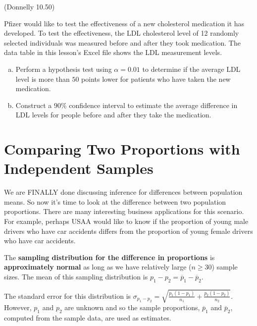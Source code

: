 \documentclass[12pt, letterpaper]{article}
\newcommand{\ds}{\displaystyle}
\newcounter{exercise}
\theoremstyle{definition}
\begin{document}
\begin{exercise}  (Donnelly 10.50)

Pfizer would like to test the effectiveness of a new cholesterol medication it has developed.  To test the effectiveness, the LDL cholesterol level of 12 randomly selected individuals was measured before and after they took medication.  The data table in this lesson's Excel file shows the LDL measurement levels.

\begin{enumerate}[(a)]

\item Perform a hypothesis test using $\alpha = 0.01$ to determine if the average LDL level is more than $50$ points lower for patients who have taken the new medication.

\item Construct a $90\%$ confidence interval to estimate the average difference in LDL levels for people before and after they take the medication.

\end{enumerate}

\end{exercise}

\vfill

\newpage

\section*{Comparing Two Proportions with Independent Samples}

\noindent We are FINALLY done discussing inference for differences between population means.  So now it's time to look at the difference between two population proportions.  There are many interesting business applications for this scenario.  For example, perhaps USAA would like to know if the proportion of young male drivers who have car accidents differs from the proportion of young female drivers who have car accidents.

\vspace*{.1in}

\noindent The \textbf{sampling distribution for the difference in proportions} is \textbf{approximately normal} as long as we have relatively large ($n\geq 30$) sample sizes.  The mean of this sampling distribution is $p_1-p_2 = \overline{p}_1-\overline{p}_2$.

\vspace*{.1in}

\noindent The standard error for this distribution is $\ds\sigma_{p_1-p_2} = \sqrt{\frac{p_1(1-p_1)}{n_1}+\frac{p_2(1-p_2)}{n_2}}$.  However, $p_1$ and $p_2$ are unknown and so the sample proportions, $\overline{p}_1$ and $\overline{p}_2$, computed from the sample data, are used as estimates.
\end{document}
